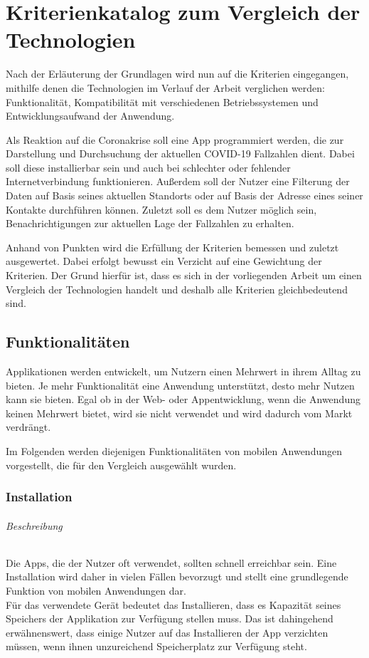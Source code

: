 \chapter{Kriterienkatalog zum Vergleich der Technologien}\label{ch:catalog}
Nach der Erläuterung der Grundlagen wird nun auf die Kriterien eingegangen, mithilfe denen die Technologien im Verlauf der Arbeit verglichen werden: Funktionalität, Kompatibilität mit verschiedenen Betriebssystemen und Entwicklungsaufwand der Anwendung.

Als Reaktion auf die Coronakrise soll eine App programmiert werden, die zur Darstellung und Durchsuchung der aktuellen COVID-19 Fallzahlen dient.
Dabei soll diese installierbar sein und auch bei schlechter oder fehlender Internetverbindung funktionieren.
Außerdem soll der Nutzer eine Filterung der Daten auf Basis seines aktuellen Standorts oder auf Basis der Adresse eines seiner Kontakte durchführen können.
Zuletzt soll es dem Nutzer möglich sein, Benachrichtigungen zur aktuellen Lage der Fallzahlen zu erhalten.

Anhand von Punkten wird die Erfüllung der Kriterien bemessen und zuletzt ausgewertet.
Dabei erfolgt bewusst ein Verzicht auf eine Gewichtung der Kriterien.
Der Grund hierfür ist, dass es sich in der vorliegenden Arbeit um einen Vergleich der Technologien handelt und deshalb alle Kriterien gleichbedeutend sind.

\section{Funktionalitäten}
Applikationen werden entwickelt, um Nutzern einen Mehrwert in ihrem Alltag zu bieten.
Je mehr Funktionalität eine Anwendung unterstützt, desto mehr Nutzen kann sie bieten.
Egal ob in der Web- oder Appentwicklung, wenn die Anwendung keinen Mehrwert bietet, wird sie nicht verwendet und wird dadurch vom Markt verdrängt.

Im Folgenden werden diejenigen Funktionalitäten von mobilen Anwendungen vorgestellt, die für den Vergleich ausgewählt wurden.

\subsection{Installation}
\subparagraph{Beschreibung\\}
Die Apps, die der Nutzer oft verwendet, sollten schnell erreichbar sein.
Eine Installation wird daher in vielen Fällen bevorzugt und stellt eine grundlegende Funktion von mobilen Anwendungen dar.\\
Für das verwendete Gerät bedeutet das Installieren, dass es Kapazität seines Speichers der Applikation zur Verfügung stellen muss.
Das ist dahingehend erwähnenswert, dass einige Nutzer auf das Installieren der App verzichten müssen, wenn ihnen unzureichend Speicherplatz zur Verfügung steht.

